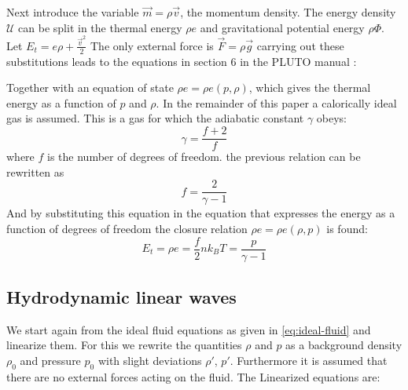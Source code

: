 Next introduce the variable $\vec{m}=\rho \vec{v}$, the momentum density. The energy density $\mathcal{U}$ can be split in the thermal energy $\rho e$ and gravitational potential energy $\rho\Phi$. Let $E_t = e\rho + \frac{\vec{v}^2}{2}$ The only external force is $\vec{F} = \rho\vec{g}$
carrying out these substitutions leads to the equations in section 6 in the PLUTO manual \cite{pluto-manual}: 

{\centering 
\noindent {}
\par}

Together with an equation of state $\rho e = \rho e(p, \rho)$, which gives the thermal energy as a function of $p$ and $\rho$.
In the remainder of this paper a calorically ideal gas is assumed. This is a gas for which the adiabatic constant $\gamma$ obeys:
\begin{equation}
	\gamma = \frac{f+2}{f}
	\label{eq:adiabatic constant}
\end{equation}
where $f$ is the number of degrees of freedom. the previous relation can be rewritten as
\begin{equation*}
	f = \frac{2}{\gamma-1}
\end{equation*}
And by substituting this equation in the equation that expresses the energy as a function of degrees of freedom the closure relation $\rho e= \rho e(\rho, p)$ is found:
\begin{equation*}
	E_t = \rho e = \frac{f}{2}nk_BT = \frac{p}{\gamma-1}
\end{equation*}
\subsection{Hydrodynamic linear waves}
We start again from the ideal fluid equations as given in \autoref{eq:ideal-fluid} and linearize them.
For this we rewrite the quantities $\rho$ and $p$ as a background density $\rho_0$ and pressure $p_0$ with slight deviations $\rho'$, $p'$.
Furthermore it is assumed that there are no external forces acting on the fluid. The Linearized equations are:

